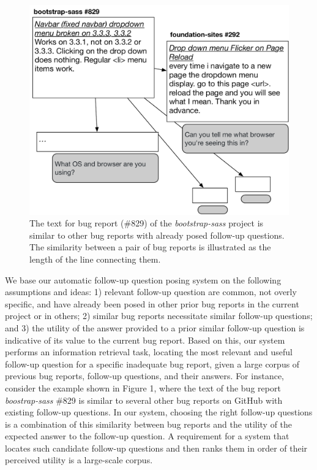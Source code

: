 \begin{figure}[t]
\centering
\includegraphics[width=0.99\linewidth]{figures/br_motivation.pdf}
\caption{The text for bug report (\#829) of the {\em bootstrap-sass} project is similar to other bug reports with already posed follow-up questions. The similarity between a pair of bug reports is illustrated as the length of the line connecting them.}
\label{fig:motivation}
\end{figure}


%
We base our automatic follow-up question posing system on the following assumptions and ideas: 1) relevant follow-up question are common, not overly specific, and have already been posed in other prior bug reports in the current project or in others; 2) similar bug reports necessitate similar follow-up questions; and 3) the utility of the answer provided to a prior similar follow-up question is indicative of its value to the current bug report.
%
Based on this, our system performs an information retrieval task, locating the most relevant and useful follow-up question for a specific inadequate bug report, given a large corpus of previous bug reports, follow-up questions, and their answers.
%
For instance, consider the example shown in Figure 1, where the text of the bug report {\em boostrap-sass} \#829 is similar to several other bug reports on GitHub with existing follow-up questions.
%
In our system, choosing the right follow-up questions is a combination of this similarity between bug reports and the utility of the expected answer to the follow-up question.
%
A requirement for a system that locates such candidate follow-up questions and then ranks them in order of their perceived utility is a large-scale corpus.

